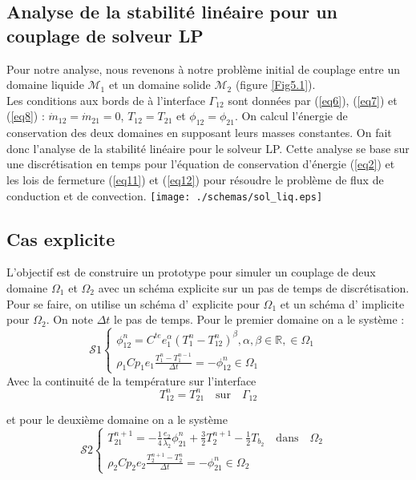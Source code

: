 \documentclass[11pt,a4paper]{scrartcl}%
\newcommand{\R}{\mathbb{R}}
\newcommand{\mtext}[1]{\quad\text{#1}\quad}%
\begin{document}
	\subsection{Analyse de la stabilité linéaire pour un couplage de solveur LP}
	Pour notre analyse, nous revenons à notre problème initial de couplage entre un domaine liquide $\mathcal{M}_1$ et un domaine solide $\mathcal{M}_2$ (figure \ref{Fig5.1}).\\
	Les conditions aux bords de  à l'interface $\Gamma_{12}$ sont données par (\ref{eq6}), (\ref{eq7}) et (\ref{eq8}) : $\dot{m}_{12} = \dot{m}_{21} = 0$, $T_{12} = T_{21}$ et $\phi_{12} = \phi_{21}$. On calcul l'énergie de conservation des deux domaines en supposant leurs masses constantes. On fait donc l'analyse de la stabilité linéaire pour le solveur LP. Cette analyse se base sur une discrétisation en temps pour l'équation de conservation d'énergie (\ref{eq2}) et les lois de fermeture (\ref{eq11}) et (\ref{eq12}) pour résoudre le problème de flux de conduction et de convection. 
	\texttt{[image: ./schemas/sol\_liq.eps]}\\
	\label{Fig5.1}
	\subsection{ Cas explicite}
	L'objectif est de construire un prototype pour simuler un couplage de deux domaine $\Omega_1$ et $\Omega_2$ avec un schéma explicite sur un pas de temps de discrétisation. Pour se faire, on utilise un schéma d' explicite pour $\Omega_1$ et un schéma d' implicite pour $\Omega_2$. On note $\Delta t$ le pas de temps. Pour le premier domaine on a le système :   
	\begin{equation}
	\mathcal{S}1
	\begin{cases}
	\phi_{12}^n = C^{te}e_1^{\alpha}(T_1^n - T_{12}^n)^{\beta}, \alpha, \beta \in\R, \in\Omega_1 & \\
	\rho_1C{p_1}e_1 \frac{T_1^n - T_1^{n-1}}{\Delta t} = -\phi_{12}^n \in\Omega_1
	\end{cases}
	\end{equation}
	Avec la continuité de la température sur l'interface
	\begin{equation}
	T_{12}^n = T_{21}^n \mtext{sur} \Gamma_{12}
	\end{equation}
	
	et pour le deuxième domaine on a le système
	\begin{equation}
	\mathcal{S}2
	\begin{cases}
	T_{21}^{n+1} = -\frac{1}{4}\frac{e_2}{\lambda_2}\phi_{21}^n + \frac{3}{2}T_{2}^{n+1} - \frac{1}{2}T_{b_2} \mtext{dans} \Omega_2 &\\
	\rho_2C{p_2}e_2 \frac{T_2^{n+1} - T_2^{n}}{\Delta t} = -\phi_{21}^n \in\Omega_2
	\end{cases}
	\end{equation}
	
\end{document}
